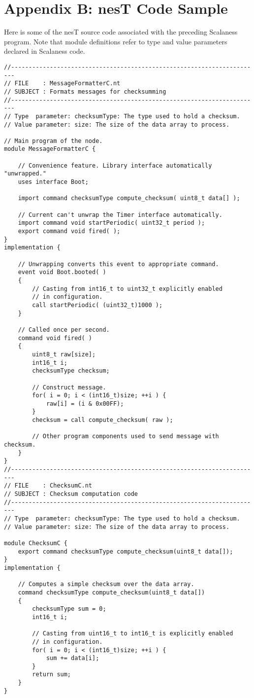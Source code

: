 \section*{Appendix B: nesT Code Sample}

Here is some of the nesT source code associated with the preceding Scalaness program. Note that
module definitions refer to type and value parameters declared in Scalaness code.

{\scriptsize
\begin{verbatim}
//-----------------------------------------------------------------------
// FILE    : MessageFormatterC.nt
// SUBJECT : Formats messages for checksumming
//-----------------------------------------------------------------------
// Type  parameter: checksumType: The type used to hold a checksum.
// Value parameter: size: The size of the data array to process.

// Main program of the node.
module MessageFormatterC {
    
    // Convenience feature. Library interface automatically "unwrapped."
    uses interface Boot;
    
    import command checksumType compute_checksum( uint8_t data[] );

    // Current can't unwrap the Timer interface automatically.
    import command void startPeriodic( uint32_t period );
    export command void fired( );
}
implementation {
    
    // Unwrapping converts this event to appropriate command.
    event void Boot.booted( )
    {
        // Casting from int16_t to uint32_t explicitly enabled 
        // in configuration.
        call startPeriodic( (uint32_t)1000 );
    }
    
    // Called once per second.
    command void fired( )
    {
        uint8_t raw[size];
        int16_t i;
        checksumType checksum;
        
        // Construct message.
        for( i = 0; i < (int16_t)size; ++i ) {
            raw[i] = (i & 0x00FF);
        }
        checksum = call compute_checksum( raw );
        
        // Other program components used to send message with checksum.
    }    
}
//-----------------------------------------------------------------------
// FILE    : ChecksumC.nt
// SUBJECT : Checksum computation code
//-----------------------------------------------------------------------
// Type  parameter: checksumType: The type used to hold a checksum.
// Value parameter: size: The size of the data array to process.

module ChecksumC {
    export command checksumType compute_checksum(uint8_t data[]);
}
implementation {
   
    // Computes a simple checksum over the data array.
    command checksumType compute_checksum(uint8_t data[])
    {
        checksumType sum = 0;
        int16_t i;
        
        // Casting from uint16_t to int16_t is explicitly enabled 
        // in configuration.
        for( i = 0; i < (int16_t)size; ++i ) {
            sum += data[i];
        }
        return sum;
    }   
}
\end{verbatim}
}
